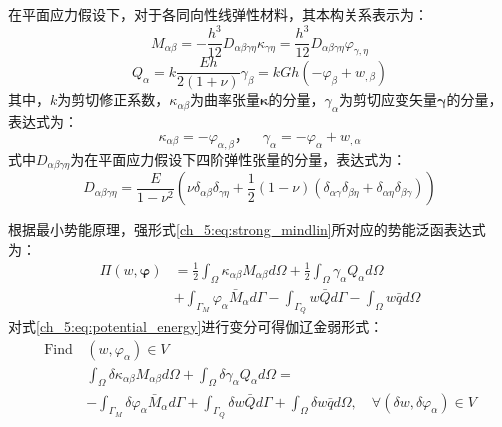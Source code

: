 在平面应力假设下，对于各同向性线弹性材料，其本构关系表示为：
\begin{equation}\label{ch_5:eq:mindlin_M}
    M_{\alpha \beta}=-\frac{h^3}{12}D_{\alpha \beta \gamma\eta}\kappa_{\gamma\eta}=\frac{h^3}{12}D_{\alpha \beta \gamma\eta}\varphi_{\gamma,\eta}
\end{equation}
\begin{equation}\label{ch_5:eq:mindlin_Q}
    Q_{\alpha}=k\frac{Eh}{2(1+\nu)}\gamma_\beta=kGh(-\varphi_\beta+w_{,\beta})
\end{equation}
其中，$k$为剪切修正系数，$\kappa_{\alpha\beta}$为曲率张量$\pmb\kappa$的分量，$\gamma_\alpha$为剪切应变矢量$\pmb\gamma$的分量，表达式为：
\begin{equation} \label{ch_5:eq:kappa}
    \kappa_{\alpha\beta}=-\varphi_{\alpha,\beta}，\quad\gamma_\alpha=-\varphi_\alpha+w_{,\alpha}
\end{equation}
式中$D_{\alpha \beta \gamma\eta}$为在平面应力假设下四阶弹性张量的分量，表达式为：
\begin{equation} 
    D_{\alpha \beta \gamma\eta}=\frac{E}{1-\nu^2}(\nu\delta_{\alpha\beta}\delta_{\gamma\eta}+\frac{1}{2}(1-\nu)(\delta_{\alpha\gamma}\delta_{\beta\eta}+\delta_{\alpha\eta}\delta_{\beta\gamma}))
\end{equation}

根据最小势能原理，强形式\eqref{ch_5:eq:strong_mindlin}所对应的势能泛函表达式为： 
\begin{equation}\label{ch_5:eq:potential_energy}
    \begin{split} 
        \Pi(w,\boldsymbol{\varphi})&=\frac{1}{2}\int_{\Omega}\kappa_{\alpha\beta}M_{\alpha\beta}d\Omega+\frac{1}{2}\int_{\Omega}\gamma_{\alpha}Q_{\alpha}d\Omega\\
        &+\int_{\Gamma_{M}}\varphi_{\alpha}{\bar{M}_{\alpha}}d\Gamma-\int_{\Gamma_{Q}}{w}\bar {Q}d\Gamma-\int_{\Omega} w\bar{q}d\Omega
    \end{split}
\end{equation}
对式\eqref{ch_5:eq:potential_energy}进行变分可得伽辽金弱形式：
\begin{equation}\label{ch_5:eq:weak_penalty_mindlin}
    \begin{split} 
        \text{Find}\,&(w,\varphi_{\alpha})\in V\\
        &\int_{\Omega}\delta\kappa_{\alpha\beta}M_{\alpha\beta}d\Omega+\int_{\Omega}\delta\gamma_{\alpha}Q_{\alpha}d\Omega=\\
        &-\int_{\Gamma_{M}}\delta\varphi_{\alpha}{\bar{M}_{\alpha}}d\Gamma+\int_{\Gamma_{Q}}{\delta{w}}\bar {Q}d\Gamma+\int_{\Omega} \delta{w}\bar{q}d\Omega,\quad \forall(\delta w,\delta\varphi_{\alpha}) \in V
    \end{split}
\end{equation}


